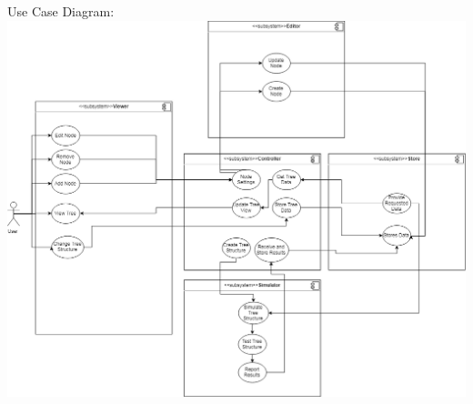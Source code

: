 \documentclass{article}
\begin{document}
  \newline \newline 
  Use Case Diagram:
  \includegraphics{TriiUseCaseDiagram}
\end{document}
